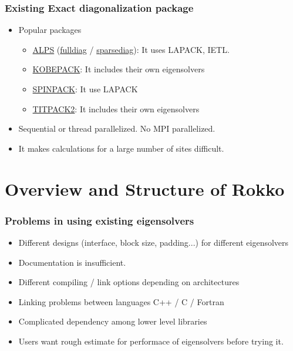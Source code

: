 \begin{frame}
  \frametitle{Existing Exact diagonalization package}
  \begin{itemize}
    \setlength{\itemsep}{1em}
  \item Popular packages
    \begin{itemize}
    \item \href{http://alps.comp-phys.org/mediawiki/index.php/Main_Page}{ALPS} (\href{http://alps.comp-phys.org/static/software/applications/diag/fulldiag/doc/}{fulldiag} / \href{http://alps.comp-phys.org/mediawiki/index.php/Documentation:sparsediag}{sparsediag}): It uses LAPACK, IETL.
    \item \href{http://quattro.phys.sci.kobe-u.ac.jp/Kobe_Pack/Kobe_Pack.html}{KOBEPACK}: It includes their own eigensolvers
    \item \href{http://www-e.uni-magdeburg.de/jschulen/spin/}{SPINPACK}: It use LAPACK
    \item \href{http://www.noc.titech.ac.jp/~phys0016_nishimori/titpack2_new/index-e.html}{TITPACK2}: It includes their own eigensolvers
    \end{itemize}
  \item Sequential or thread parallelized. No MPI parallelized.
  \item It makes calculations for a large number of sites difficult.
  \end{itemize}
\end{frame}

\section{Overview and Structure of Rokko}

\begin{frame}
  \frametitle{Problems in using existing eigensolvers}
  \begin{itemize}
    \setlength{\itemsep}{1em}
  \item Different designs (interface, block size, padding...) for different eigensolvers
  \item Documentation is insufficient.
  \item Different compiling / link options depending on architectures
  \item Linking problems between languages C++ / C / Fortran
  \item Complicated dependency among lower level libraries
  \item Users want rough estimate for performace of eigensolvers before trying it.
  \end{itemize}
\end{frame}


